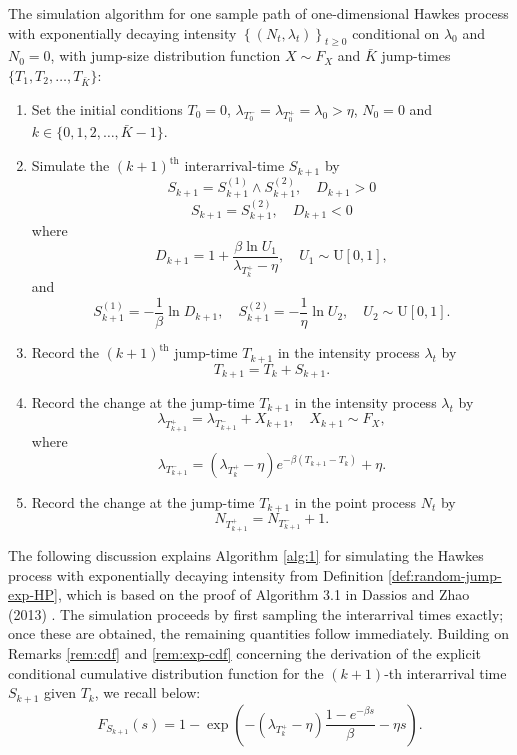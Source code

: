 \documentclass[12pt,a4paper]{report}
\theoremstyle{plain}
\theoremstyle{definition}
\theoremstyle{remark}
\newcommand{\1}{\mathbf{1}}
\begin{document}
\begin{algorithm}
\caption{(Algorithm 3.1 of Dassios and Zhao (2013) \cite{DZ13}) One-dimensional, random jump size Hawkes process with exponentially decaying intensity simulation algorithm}
\label{alg:1}
The simulation algorithm for one sample path of one-dimensional Hawkes process with exponentially decaying intensity $\left\{\left(N_t,\lambda_t\right)\right\}_{t\geq 0}$ conditional on $\lambda_0$ and $N_0 = 0$, with jump-size distribution function $X\sim F_X$ and $\bar{K}$ jump-times $\{T_1,T_2,\dots,T_{\bar{K}}\}$:

\begin{enumerate}[leftmargin=*,label=\textbf{Step \arabic*.}]
\item Set the initial conditions $T_0 = 0$, $\lambda_{T_0^-}=\lambda_{T_0^+} = \lambda_0 > \eta$, $N_0 = 0$ and $k\in \{0,1,2,\dots,\bar{K}-1\}$.

\item Simulate the $(k+1)^{\text{th}}$ interarrival-time $S_{k+1}$ by
\[
S_{k+1} = S_{k+1}^{(1)} \wedge S_{k+1}^{(2)}, \quad D_{k+1}>0
\]
\[
S_{k+1} = S_{k+1}^{(2)}, \quad D_{k+1}<0
\]
where
\[
D_{k+1} = 1 + \frac{\beta \ln U_1}{\lambda_{T_k^+} - \eta},\quad U_1\sim \mathrm{U}[0,1],
\]
and
\[
S_{k+1}^{(1)} = -\frac{1}{\beta}\ln D_{k+1},\quad S_{k+1}^{(2)} = -\frac{1}{\eta}\ln U_2,\quad U_2\sim \mathrm{U}[0,1].
\]

\item Record the $(k+1)^{\text{th}}$ jump-time $T_{k+1}$ in the intensity process $\lambda_t$ by
\[
T_{k+1} = T_k + S_{k+1}.
\]

\item Record the change at the jump-time $T_{k+1}$ in the intensity process $\lambda_t$ by
\[
\lambda_{T_{k+1}^+} = \lambda_{T_{k+1}^-} + X_{k+1},\quad X_{k+1}\sim F_X,
\]
where
\[
\lambda_{T_{k+1}^-} = \left(\lambda_{T_k^+} - \eta\right)e^{-\beta (T_{k+1} - T_k)} + \eta.
\]

\item Record the change at the jump-time $T_{k+1}$ in the point process $N_t$ by
\[
N_{T_{k+1}^+} = N_{T_{k+1}^-} + 1.
\]
\end{enumerate}
\end{algorithm}

\medskip
\noindent
The following discussion explains Algorithm \ref{alg:1} for simulating the Hawkes process with exponentially decaying intensity from Definition \ref{def:random-jump-exp-HP}, which is based on the proof of Algorithm 3.1 in Dassios and Zhao (2013) \cite{DZ13}. The simulation proceeds by first sampling the interarrival times exactly; once these are obtained, the remaining quantities follow immediately. Building on Remarks \ref{rem:cdf} and \ref{rem:exp-cdf} concerning the derivation of the explicit conditional cumulative distribution function for the \((k+1)\)-th interarrival time \(S_{k+1}\) given \(T_k\), we recall below:
\begin{equation}\label{eq:S-cdf}
F_{S_{k+1}}(s) = 1 - \exp\left(-\left(\lambda_{T_k^+} - \eta\right)\frac{1 - e^{-\beta s}}{\beta} - \eta s\right).
\end{equation}
\end{document}
